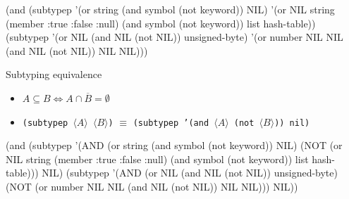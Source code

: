 \documentclass[aspectratio=169]{beamer}
\renewcommand\code[1]{\texttt{#1}}
\newcommand\plholder[1]{\ensuremath{\langle {#1} \rangle}}
\begin{document}
\begin{frame}[fragile]
  \begin{popup}{.65}
    \begin{mintedcodebox}
\begin{localcl}
(and (subtypep '(or string
                    (and symbol
                         (not keyword))
                    NIL)
               '(or NIL
                    string
                    (member :true :false :null)
                    (and symbol
                         (not keyword))
                    list
                    hash-table))
     (subtypep '(or NIL
                    (and NIL
                         (not NIL))
                    unsigned-byte)
               '(or number
                    NIL
                    NIL
                    (and NIL
                         (not NIL))
                    NIL
                    NIL)))
\end{localcl}
    \end{mintedcodebox}
  \end{popup}

  \begin{popup}{.75}
    \begin{macosbox}{Subtyping equivalence}
      \begin{itemize}
      \item $A \subseteq B \Leftrightarrow A \cap \overline B
        = \emptyset$
      \item {\small\code{(subtypep \plholder A \plholder B)} $\equiv$
          \code{(subtypep '(and \plholder A (not \plholder B)) nil)}}
      \end{itemize}
    \end{macosbox}
  \end{popup}

  \begin{popup}{.65}
    \vspace*{-2.5em}
    \begin{mintedcodebox}
\begin{localcl}
(and (subtypep '(AND (or string
                         (and symbol
                              (not keyword))
                         NIL)
                     (NOT (or NIL
                              string
                              (member :true :false :null)
                              (and symbol
                                   (not keyword))
                              list
                              hash-table)))
               NIL)
     (subtypep '(AND (or NIL
                         (and NIL
                              (not NIL))
                         unsigned-byte)
                     (NOT (or number
                              NIL
                              NIL
                              (and NIL
                                   (not NIL))
                              NIL
                              NIL)))
               NIL))
\end{localcl}
    \end{mintedcodebox}
  \end{popup}


\end{frame}
\end{document}
